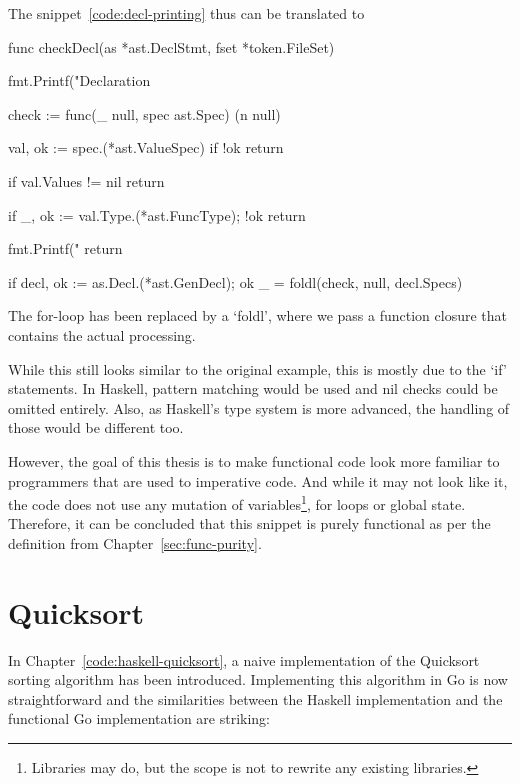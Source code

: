 The snippet~\ref{code:decl-printing} thus can be translated to

\begin{code}
	\begin{gocode}
func checkDecl(as *ast.DeclStmt, fset *token.FileSet) {
	fmt.Printf("Declaration %

	check := func(_ null, spec ast.Spec) (n null) {
		val, ok := spec.(*ast.ValueSpec)
		if !ok {
			return
		}

		if val.Values != nil {
			return
		}

		if _, ok := val.Type.(*ast.FuncType); !ok {
			return
		}

		fmt.Printf("\tIdent %
		return
	}

	if decl, ok := as.Decl.(*ast.GenDecl); ok {
		_ = foldl(check, null{}, decl.Specs)
	}
}
\end{gocode}
\end{code}
The for-loop has been replaced by a `foldl', where we pass a function closure
that contains the actual processing.

While this still looks similar to the original example, this is mostly due to
the `if' statements. In Haskell, pattern matching would be used and nil checks
could be omitted entirely. Also, as Haskell's type system is more advanced, the
handling of those would be different too.

However, the goal of this thesis is to make functional code look more familiar
to programmers that are used to imperative code.
And while it may not look like it, the code does not use any mutation of
variables\footnote{Libraries may do, but the scope is not to rewrite any existing
libraries.}, for loops or global state. Therefore, it can be concluded that this
snippet is purely functional as per the definition from Chapter~\ref{sec:func-purity}.

\section{Quicksort}

In Chapter~\ref{code:haskell-quicksort}, a naive implementation of the Quicksort sorting
algorithm has been introduced.
Implementing this algorithm in Go is now straightforward and the similarities between
the Haskell implementation and the functional Go implementation are striking:

